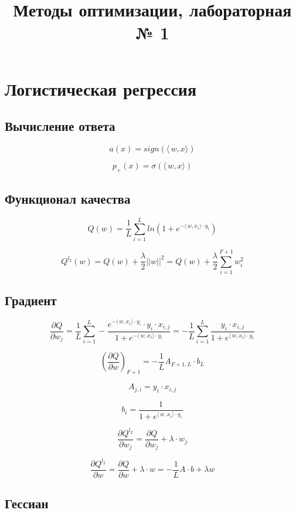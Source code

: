 \documentclass[12pt]{article}
\title{Методы оптимизации, лабораторная № 1}
\begin{document}
	\maketitle
	
\section{Логистическая регрессия}

\subsection{Вычисление ответа}
$$a(x) = sign(\langle\,w,x\rangle)$$

$$p_+(x) = \sigma(\langle\,w,x\rangle)$$

\subsection{Функционал качества}

$$Q(w) = \frac{1}{L}\sum\limits_{i = 1}^L ln(1 + e^{-\langle\,w,x_i\rangle\cdot y_i})$$

$$Q^{l_2}(w) = Q(w) + \frac{\lambda}{2}||w||^2 = Q(w) + \frac{\lambda}{2} \sum\limits_{i = 1}^{F+1}w_i^2$$

\subsection{Градиент}

$$\frac{\partial Q}{\partial w_j} = \frac{1}{L}\sum\limits_{i = 1}^{L}-\frac{e^{-\langle\,w,x_i\rangle\cdot y_i} \cdot y_i \cdot x_{i, j}}{1 + e^{-\langle\,w,x_i\rangle\cdot y_i}} = -\frac{1}{L}\sum\limits_{i = 1}^{L}\frac{y_i \cdot x_{i, j}}{1 + e^{\langle\,w,x_i\rangle\cdot y_i}} $$

\[ 
\left( \frac{\partial Q}{\partial w} \right)_{F+1} =-\frac{1}{L} A_{F+1, L} \cdot b_{L}
\]

$$A_{j, i} = y_{i} \cdot x_{i, j}$$

$$b_i = \frac{1}{1 + e^{\langle\,w,x_i\rangle\cdot y_i}}$$

$$\frac{\partial Q^{l_2}}{\partial w_j} = \frac{\partial Q}{\partial w_j}  + \lambda \cdot w_j $$

$$\frac{\partial Q^{l_2}}{\partial w} = \frac{\partial Q}{\partial w}  + \lambda \cdot w = -\frac{1}{L} A \cdot b + \lambda w$$

\subsection{Гессиан}
\end{document}
